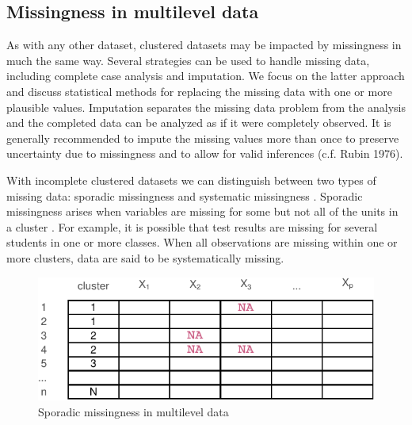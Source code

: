 \documentclass[
]{jss}
\begin{document}
\hypertarget{missingness-in-multilevel-data}{%
\subsection{Missingness in multilevel
data}\label{missingness-in-multilevel-data}}

As with any other dataset, clustered datasets may be impacted by
missingness in much the same way. Several strategies can be used to
handle missing data, including complete case analysis and imputation. We
focus on the latter approach and discuss statistical methods for
replacing the missing data with one or more plausible values. Imputation
separates the missing data problem from the analysis and the completed
data can be analyzed as if it were completely observed. It is generally
recommended to impute the missing values more than once to preserve
uncertainty due to missingness and to allow for valid inferences (c.f.
Rubin 1976).

With incomplete clustered datasets we can distinguish between two types
of missing data: sporadic missingness and systematic missingness
\citep{resc13}. Sporadic missingness arises when variables are missing
for some but not all of the units in a cluster \citep{buur18, jola18}.
For example, it is possible that test results are missing for several
students in one or more classes. When all observations are missing
within one or more clusters, data are said to be systematically missing.

\begin{CodeChunk}
\begin{figure}

{\centering \includegraphics{Imputation_of_Incomplete_Multilevel_Data_files/figure-latex/patterns-1} 

}

\caption[Sporadic missingness in multilevel data]{Sporadic missingness in multilevel data}\label{fig:patterns}
\end{figure}
\end{CodeChunk}
\end{document}
